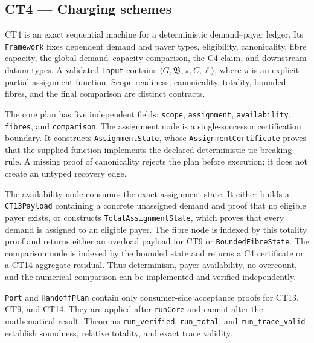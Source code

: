 \subsection{CT4 --- Charging schemes}\label{ct:4}\label{charging-schemes}

CT4 is an exact sequential machine for a deterministic demand--payer ledger.
Its \texttt{Framework} fixes dependent demand and payer types, eligibility,
canonicality, fibre capacity, the global demand--capacity comparison, the C4
claim, and downstream datum types.  A validated \texttt{Input} contains
\(\langle G,\mathfrak B,\pi,C,\ell\rangle\), where \(\pi\) is an explicit
partial assignment function.  Scope readiness, canonicality, totality, bounded
fibres, and the final comparison are distinct contracts.

The core plan has five independent fields:
\texttt{scope}, \texttt{assignment}, \texttt{availability},
\texttt{fibres}, and \texttt{comparison}.  The assignment node is a
single-successor certification boundary.  It constructs
\texttt{AssignmentState}, whose \texttt{AssignmentCertificate} proves that
the supplied function implements the declared deterministic tie-breaking
rule.  A missing proof of canonicality rejects the plan before execution; it
does not create an untyped recovery edge.

The availability node consumes the exact assignment state.  It either builds a
\texttt{CT13Payload} containing a concrete unassigned demand and proof that no
eligible payer exists, or constructs \texttt{TotalAssignmentState}, which
proves that every demand is assigned to an eligible payer.  The fibre node is
indexed by this totality proof and returns either an overload payload for CT9
or \texttt{BoundedFibreState}.  The comparison node is indexed by the bounded
state and returns a C4 certificate or a CT14 aggregate residual.  Thus
determinism, payer availability, no-overcount, and the numerical comparison
can be implemented and verified independently.

\texttt{Port} and \texttt{HandoffPlan} contain only consumer-side acceptance
proofs for CT13, CT9, and CT14.  They are applied after \texttt{runCore} and
cannot alter the mathematical result.  Theorems \texttt{run\_verified},
\texttt{run\_total}, and \texttt{run\_trace\_valid} establish soundness,
relative totality, and exact trace validity.

